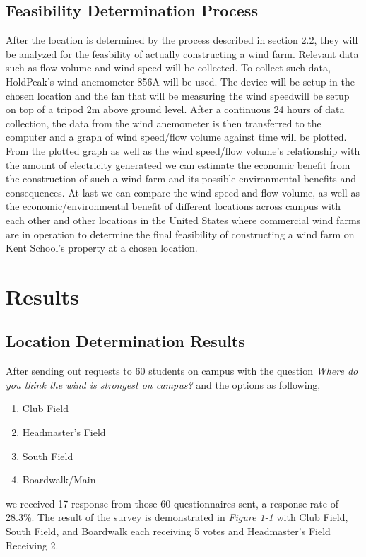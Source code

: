 \documentclass[review]{elsarticle}
\begin{document}
\subsection{Feasibility Determination Process}
After the location is determined by the process described in section 2.2, they will be analyzed for the feasbility of actually constructing a wind farm. Relevant data 
such as flow volume and wind speed will be collected. To collect such data, HoldPeak's wind anemometer 856A will be used. The device will be setup in the chosen location 
and the fan that will be measuring the wind speedwill be setup on top of a tripod 2m above ground level. After a continuous 24 hours of data collection, the data from the 
wind anemometer is then transferred to the computer and a graph of wind speed/flow volume against time will be plotted.
\\\indent From the plotted graph as well as the wind speed/flow volume's relationship with the amount of electricity generateed we can estimate the economic benefit from 
the construction of such a wind farm and its possible environmental benefits and consequences. At last we can compare the wind speed and flow volume, as well as the 
economic/environmental benefit of different locations across campus with each other and other locations in the United States where commercial wind farms are in operation 
to determine the final feasibility of constructing a wind farm on Kent School's property at a chosen location.



\section{Results}
\subsection{Location Determination Results}
After sending out requests to 60 students on campus with the question \textit{Where do you think the wind is strongest on campus?} and the options as following,
\begin{enumerate}
    \item {Club Field}
    \item {Headmaster's Field}
    \item {South Field}
    \item {Boardwalk/Main}   
\end{enumerate}
we received 17 response from those 60 questionnaires sent, a response rate of 28.3\%. The result of the survey is demonstrated in \textit{Figure 1-1} with Club Field, South Field, and Boardwalk each receiving 5 votes and Headmaster's Field Receiving 2. 
\end{document}
